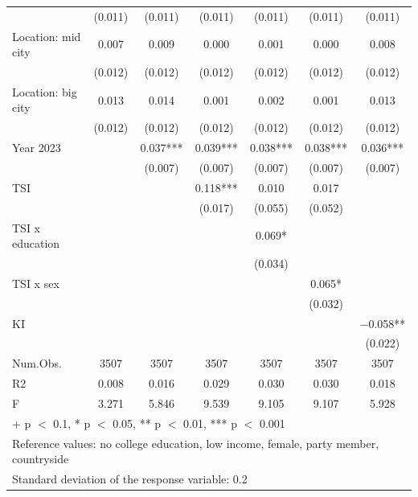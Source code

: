 \documentclass[
  letterpaper,
  DIV=11,
  numbers=noendperiod]{scrartcl}
\begin{document}
\begin{table}
{\begin{tabular}[t]{lcccccc}
 & (\num{0.011}) & (\num{0.011}) & (\num{0.011}) & (\num{0.011}) & (\num{0.011}) & (\num{0.011})\\
Location: mid city & \num{0.007} & \num{0.009} & \num{0.000} & \num{0.001} & \num{0.000} & \num{0.008}\\
 & (\num{0.012}) & (\num{0.012}) & (\num{0.012}) & (\num{0.012}) & (\num{0.012}) & \vphantom{1} (\num{0.012})\\
Location: big city & \num{0.013} & \num{0.014} & \num{0.001} & \num{0.002} & \num{0.001} & \num{0.013}\\
 & (\num{0.012}) & (\num{0.012}) & (\num{0.012}) & (\num{0.012}) & (\num{0.012}) & (\num{0.012})\\
Year 2023 &  & \num{0.037}*** & \num{0.039}*** & \num{0.038}*** & \num{0.038}*** & \num{0.036}***\\
 &  & (\num{0.007}) & (\num{0.007}) & (\num{0.007}) & (\num{0.007}) & (\num{0.007})\\
TSI &  &  & \num{0.118}*** & \num{0.010} & \num{0.017} & \\
 &  &  & (\num{0.017}) & (\num{0.055}) & (\num{0.052}) & \\
TSI x education &  &  &  & \num{0.069}* &  & \\
 &  &  &  & (\num{0.034}) &  & \\
TSI x sex &  &  &  &  & \num{0.065}* & \\
 &  &  &  &  & (\num{0.032}) & \\
KI &  &  &  &  &  & \num{-0.058}**\\
 &  &  &  &  &  & (\num{0.022})\\
\midrule
Num.Obs. & \num{3507} & \num{3507} & \num{3507} & \num{3507} & \num{3507} & \num{3507}\\
R2 & \num{0.008} & \num{0.016} & \num{0.029} & \num{0.030} & \num{0.030} & \num{0.018}\\
F & \num{3.271} & \num{5.846} & \num{9.539} & \num{9.105} & \num{9.107} & \num{5.928}\\
\bottomrule
\multicolumn{7}{l}{\rule{0pt}{1em}+ p $<$ 0.1, * p $<$ 0.05, ** p $<$ 0.01, *** p $<$ 0.001}\\
\multicolumn{7}{l}{\rule{0pt}{1em}Reference values: no college education, low income, female, party member, countryside}\\
\multicolumn{7}{l}{\rule{0pt}{1em}Standard deviation of the response variable:  0.2}\\
\end{tabular}

}

\end{table}%
\end{document}
